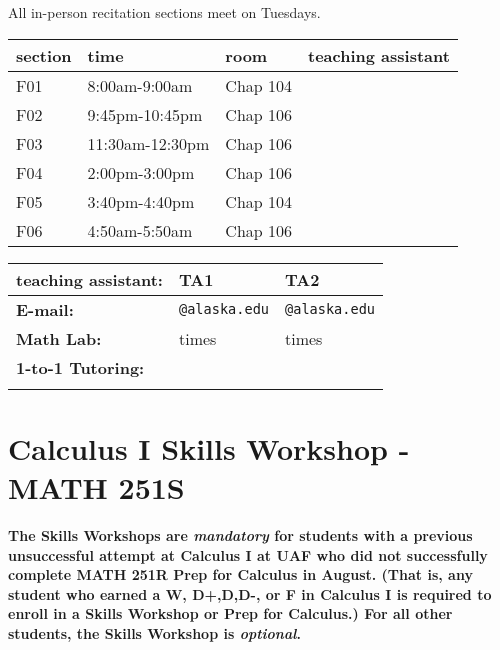 \documentclass[11pt,fleqn]{article}
\begin{document}
All in-person recitation sections meet on Tuesdays.\\

\begin{center}
\vfill

\begin{tabular}{| l | l | l | l |}
\hline
section & time & room& teaching assistant \\
\hline \hline
F01&8:00am-9:00am&Chap 104& \\ \hline
F02&9:45pm-10:45pm&Chap 106& \\ \hline
F03&11:30am-12:30pm&Chap 106&\\ \hline
F04&2:00pm-3:00pm&Chap 106&\\ \hline
F05&3:40pm-4:40pm&Chap 104&\\ \hline
F06&4:50am-5:50am&Chap 106&\\ \hline
\end{tabular}

\begin{tabular}{| l || l | l |}
\hline
\textbf{teaching assistant:}&TA1&TA2\\
\hline \hline
\textbf{E-mail:}&\texttt{@alaska.edu} & \texttt{@alaska.edu} \\
\hline
\textbf{Math Lab:}&times & times \\
\hline
\textbf{1-to-1 Tutoring:}& &  \\
&&\\
\hline
\end{tabular}
\end{center}
\vfill


\newpage
\section{Calculus I Skills Workshop - MATH 251S}

\textbf{The Skills Workshops are \emph{mandatory} for students with a previous unsuccessful attempt at Calculus I at UAF who did not successfully complete MATH 251R Prep for Calculus in August. (That is, any student who earned a W, D+,D,D-, or F in Calculus I is required to enroll in a Skills Workshop or Prep for Calculus.) For all other students, the Skills Workshop is \emph{optional}.}
\end{document}
